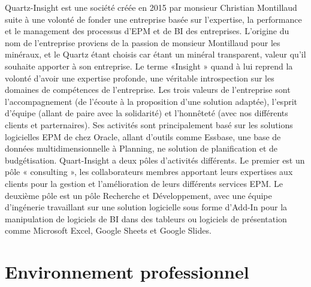 \documentclass[a4paper, 11pt]{report}
\begin{document}
Quartz-Insight est une société créée en 2015 par monsieur Christian Montillaud suite à une volonté de fonder une entreprise basée sur l’expertise,  la performance et le management des processus d’EPM et de BI des entreprises.
L’origine du nom de l’entreprise proviens de la passion de monsieur  Montillaud pour les minéraux, et le Quartz étant choisis car étant un minéral transparent, valeur qu’il souhaite apporter à son entreprise.
Le terme «Insight » quand à lui reprend la volonté d’avoir une expertise profonde, une véritable introspection sur les domaines de compétences de l’entreprise.
\newline
\newline
Les trois valeurs de l’entreprise sont l’accompagnement (de l’écoute à la proposition d’une solution adaptée), l’esprit d’équipe (allant de paire avec la solidarité) et l’honnêteté (avec nos différents clients et parternaires).
\newline
\newline
Ses activités sont principalement basé sur les solutions logicielles EPM  de chez Oracle, allant d’outils comme Essbase, une base de données multidimensionnelle à Planning, ne solution de planification et de budgétisation.
Quart-Insight a deux pôles d’activités différents.
Le premier est un pôle « consulting », les collaborateurs membres apportant leurs expertises aux clients pour la gestion et l’amélioration de leurs différents services EPM.
Le deuxième pôle est un pôle Recherche et Développement, avec une équipe d’ingénerie travaillant sur une solution logicielle sous forme d’Add-In pour la manipulation de logiciels de BI dans des tableurs ou logiciels de présentation comme Microsoft Excel, Google Sheets et Google Slides.    
\clearpage

\chapter{Environnement professionnel}
\end{document}
